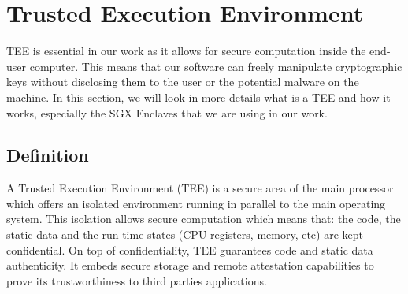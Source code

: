 \documentclass[../main.tex]{subfiles}
\begin{document}
\section{Trusted Execution Environment}
\label{section:theoric:tee}
\par TEE is essential in our work as it allows for secure computation inside the end-user computer. This means that our software can freely manipulate cryptographic keys without disclosing them to the user or the potential malware on the machine. In this section, we will look in more details what is a TEE and how it works, especially the SGX Enclaves that we are using in our work.

\subsection{Definition}
\label{section:theoric:tee_definition}
\par A Trusted Execution Environment (TEE) is a secure area of the main processor which offers an isolated environment running in parallel to the main operating system. This isolation allows secure computation which means that: the code, the static data and the run-time states (CPU registers, memory, etc) are kept confidential. On top of confidentiality, TEE guarantees code and static data authenticity. It embeds secure storage and remote attestation capabilities to prove its trustworthiness to third parties applications.
\end{document}
